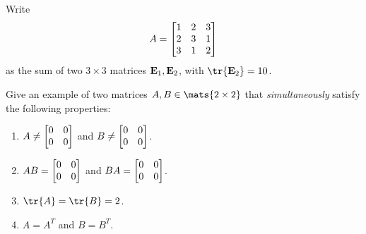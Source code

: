 \begin{pro}
Write $$ A =
\begin{bmatrix} 1 & 2 & 3 \cr 2 & 3 & 1 \cr 3 & 1 & 2
\cr\end{bmatrix}$$ as the sum of two
$3\times 3$ matrices ${\bf E}_1, {\bf E}_2$, with $\tr{{\bf E}_2} =
10$.
\end{pro}
\begin{pro}
Give an example of two matrices $A, B\in\mats{2\times 2}$ 
that {\em simultaneously} satisfy the following
 properties:
 \begin{enumerate}
\item $A\neq \begin{bmatrix}0 & 0 \cr 0 & 0 \cr  \end{bmatrix}$ and $B\neq \begin{bmatrix}0 & 0 \cr 0 & 0 \cr
\end{bmatrix}$.
\item $AB=\begin{bmatrix}0 & 0 \cr 0 & 0 \cr  \end{bmatrix}$ and $BA=\begin{bmatrix}0 & 0 \cr 0 & 0 \cr
\end{bmatrix}$.
\item $\tr{A}=\tr{B}=2$.
\item $A=A^T$ and $B=B^T$.
 \end{enumerate}
\end{pro}

